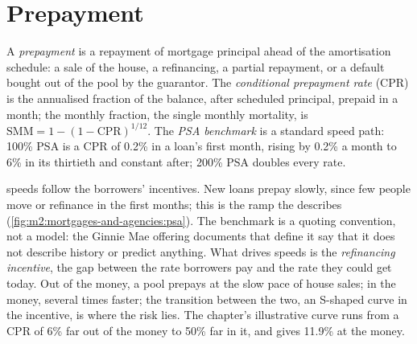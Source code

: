 \section{Prepayment}

\begin{definition}\label{def:m2:mortgages-and-agencies:cpr}
A \emph{prepayment} is a repayment of mortgage principal
ahead of the amortisation schedule: a sale of the house, a refinancing, a
partial repayment, or a default bought out of the pool by the guarantor. The
\emph{conditional prepayment rate} (CPR) is
the annualised fraction of the balance, after scheduled principal, prepaid in a
month; the monthly fraction, the single monthly mortality, is
$\mathrm{SMM} = 1 - (1-\mathrm{CPR})^{1/12}$. The \emph{PSA
benchmark} is a standard speed path: 100\% PSA is a CPR of
0.2\% in a loan's first month, rising by 0.2\% a month to 6\% in its thirtieth
and constant after; 200\% PSA doubles every rate.
\end{definition}

 speeds follow the borrowers' incentives. New loans prepay slowly,
since few people move or refinance in the first months; this is the ramp the
 describes (\cref{fig:m2:mortgages-and-agencies:psa}). The
benchmark is a quoting convention, not a model: the Ginnie Mae offering
documents that define it say that it does not describe history or predict
anything. What drives speeds is the \emph{refinancing incentive}, the gap
between the rate borrowers pay and the rate they could get today. Out of the
money, a pool prepays at the slow pace of house sales; in the money, several
times faster; the transition between the two, an S-shaped curve in the
incentive, is where the risk lies. The chapter's illustrative curve runs from
a CPR of 6\% far out of the money to 50\% far in it, and gives 11.9\% at the
money.


